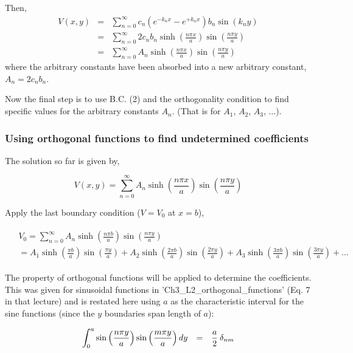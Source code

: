\documentclass[12pt]{article}
\begin{document}
\begin{flushleft}
Then,
\begin{eqnarray*}
V(x,y) & = & \sum_{n=0}^{\infty} c_{n}\left( e^{-k_{n}x}-e^{+k_{n}x} \right) b_{n} \sin{(k_{n}y)}\\
          & = & \sum_{n=0}^{\infty} 2c_{n}b_{n}\sinh{ \left(\frac{n\pi x}{a}\right) }\sin{ \left(\frac{n\pi y}{a}\right) } \\
          & = & \sum_{n=0}^{\infty} A_{n}\sinh{ \left(\frac{n\pi x}{a}\right) }\sin{ \left(\frac{n\pi y}{a}\right) } 
\end{eqnarray*}
where the arbitrary constants have been absorbed into a new arbitrary constant, $A_{n}=2c_{n}b_{n}$.

Now the final step is to use B.C. (2) and the orthogonality condition to find specific values for the arbitrary constants $A_{n}$.  (That is for $A_{1}$, $A_{2}$, $A_{3}$, $\ldots$).

\subsubsection*{\color{myblue} Using orthogonal functions to find undetermined coefficients}

The solution so far is given by,

\[
V(x,y) = \sum_{n=0}^{\infty} A_{n}\sinh{ \left(\frac{n\pi x}{a}\right) }\sin{ \left(\frac{n\pi y}{a}\right) } 
\]
 
Apply the last boundary condition ($V=V_{0}$ at $x=b$),

\begin{eqnarray}
\begin{aligned}
& V_{0} = \sum_{n=0}^{\infty} A_{n}\sinh{\left(\frac{n\pi b}{a}\right)}\sin{\left(\frac{n\pi y}{a}\right)} \\
& = A_{1}\sinh{\left(\frac{\pi b}{a}\right)}\sin{\left(\frac{\pi y}{a}\right)} + A_{2}\sinh{\left(\frac{2\pi b}{a}\right)}\sin{\left(\frac{2\pi y}{a}\right)} + A_{3}\sinh{ \left(\frac{3\pi b}{a}\right) }\sin{ \left(\frac{3\pi y}{a}\right) } + \ldots
\end{aligned}
\label{eq:onecoeffremains}
\end{eqnarray}

The property of orthogonal functions will be applied to determine the coefficients.  This was given for sinusoidal functions in 'Ch3\_L2\_orthogonal\_functions' (Eq. 7 in that lecture) and is restated here using $a$ as the characteristic interval for the sine functions (since the $y$ boundaries span length of $a$):

\begin{equation*}
\int_{0}^{a} \sin{\left(\frac{n\pi y}{a}\right)}\sin{\left(\frac{m\pi y}{a}\right)} \, dy \hspace{.1in} = \hspace{.1in} \frac{a}{2} \: \delta_{nm}
\end{equation*}


\end{flushleft}
\end{document}
